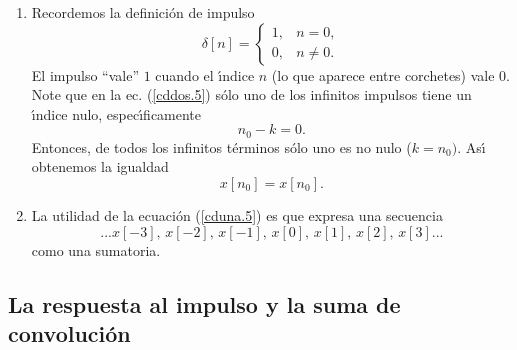 \begin{enumerate}
\item Recordemos la definici\'{o}n de impulso
  \begin{equation}
    \delta \left[ n\right] =\left\{ 
      \begin{array}{cc}
        1, & n=0, \\ 
        0, & n\neq 0.
      \end{array}
    \right.
  \end{equation}
  El impulso ``vale'' $1$ cuando el \'{\i}ndice $n$ (lo que aparece
  entre corchetes) vale $0$. Note que en la ec. (\ref{cddos.5}) s\'{o}lo
  uno de los infinitos impulsos tiene un \'{\i}ndice nulo,
  espec\'{\i}ficamente
  \begin{equation}
    n_{0}-k=0.
  \end{equation}
  Entonces, de todos los infinitos t\'{e}rminos s\'{o}lo uno es no
  nulo ($k=n_{0})$.  As\'{\i} obtenemos la igualdad
  \begin{equation}
    x\left[ n_{0}\right] =x\left[ n_{0}\right] .
  \end{equation}

\item La utilidad de la ecuaci\'{o}n (\ref{cduna.5}) es que expresa una
  secuencia
  \begin{equation}
    ...x[-3], \, x[-2], \, x[-1], \, x[0], \, x[1], \, x[2], \, x[3]...
  \end{equation}
  como una sumatoria.

\end{enumerate}

\subsection{La respuesta al impulso y la suma de convoluci\'{o}n}

